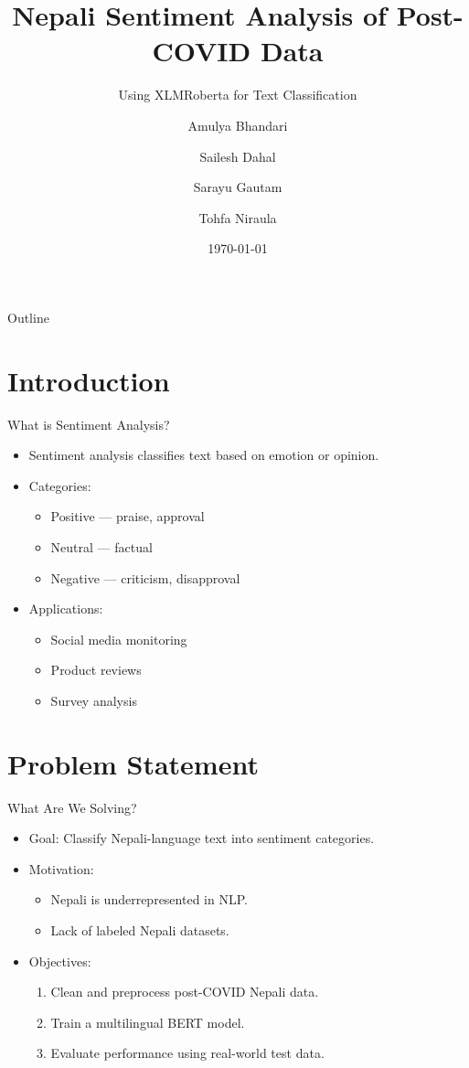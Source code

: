 \documentclass[aspectratio=169]{beamer}
\title{Nepali Sentiment Analysis of Post-COVID Data}
\subtitle{Using XLMRoberta for Text Classification}
\author{Amulya Bhandari \and Sailesh Dahal \and Sarayu Gautam \and Tohfa Niraula}
\institute{Department of Computer Engineering\\Kathmandu University}
\date{\today}
\begin{document}
\maketitle

\begin{frame}{Outline}
  \tableofcontents
\end{frame}

\section{Introduction}
\begin{frame}{What is Sentiment Analysis?}
  \begin{itemize}
    \item Sentiment analysis classifies text based on emotion or opinion.
    \item Categories:
          \begin{itemize}
            \item Positive — praise, approval
            \item Neutral — factual
            \item Negative — criticism, disapproval
          \end{itemize}
    \item Applications:
          \begin{itemize}
            \item Social media monitoring
            \item Product reviews
            \item Survey analysis
          \end{itemize}
  \end{itemize}
\end{frame}

\section{Problem Statement}
\begin{frame}{What Are We Solving?}
  \begin{itemize}
    \item Goal: Classify Nepali-language text into sentiment categories.
    \item Motivation:
          \begin{itemize}
            \item Nepali is underrepresented in NLP.
            \item Lack of labeled Nepali datasets.
          \end{itemize}
    \item Objectives:
          \begin{enumerate}
            \item Clean and preprocess post-COVID Nepali data.
            \item Train a multilingual BERT model.
            \item Evaluate performance using real-world test data.
          \end{enumerate}
  \end{itemize}
\end{frame}
\end{document}
